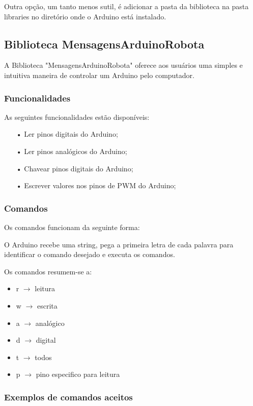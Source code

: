 Outra opção, um tanto menos sutil, é adicionar a pasta da biblioteca na pasta libraries no diretório onde o Arduino está instalado.

\subsection{Biblioteca MensagensArduinoRobota}

A Biblioteca "MensagensArduinoRobota" oferece aos usuários uma simples e intuitiva maneira de controlar um Arduino pelo computador.

\subsubsection{Funcionalidades}

As seguintes funcionalidades estão disponíveis:
\begin{itemize}
\item[•] Ler pinos digitais do Arduino;
\item[•] Ler pinos analógicos do Arduino;
\item[•] Chavear pinos digitais do Arduino;
\item[•] Escrever valores nos pinos de PWM do Arduino;
\end{itemize}

\subsubsection{Comandos}

Os comandos funcionam da seguinte forma:

O Arduino recebe uma string, pega a primeira letra de cada palavra para identificar o comando desejado e executa os comandos.

Os comandos resumem-se a:
\begin{itemize}
\item r $\to$ leitura
\item w $\to$ escrita
\item a $\to$ analógico
\item d $\to$ digital
\item t $\to$ todos
\item p $\to$ pino especifico para leitura
\end{itemize}

\subsubsection{Exemplos de comandos aceitos}


